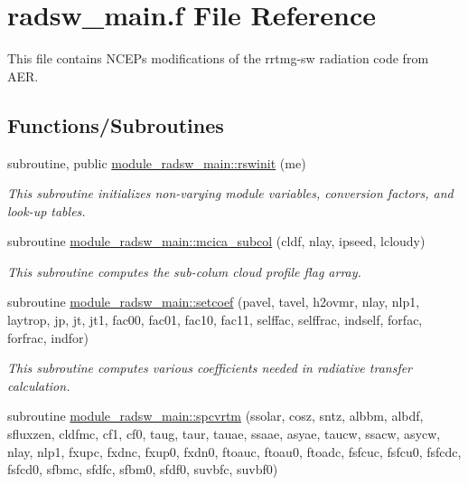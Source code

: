 \hypertarget{radsw__main_8f}{}\section{radsw\+\_\+main.\+f File Reference}
\label{radsw__main_8f}


This file contains N\+C\+EP\textquotesingle{}s modifications of the rrtmg-\/sw radiation code from A\+ER.  


\subsection*{Functions/\+Subroutines}
\begin{DoxyCompactItemize}
\item 
subroutine, public \hyperlink{group__module__radsw__main_ga5b0d35149515607d94f42b6ee5a40665}{module\+\_\+radsw\+\_\+main\+::rswinit} (me)
\begin{DoxyCompactList}\small\item\em This subroutine initializes non-\/varying module variables, conversion factors, and look-\/up tables. \end{DoxyCompactList}\item 
subroutine \hyperlink{group__module__radsw__main_gadf2f35094ed7dc31e8f52781745cf021}{module\+\_\+radsw\+\_\+main\+::mcica\+\_\+subcol} (cldf, nlay, ipseed, lcloudy)
\begin{DoxyCompactList}\small\item\em This subroutine computes the sub-\/colum cloud profile flag array. \end{DoxyCompactList}\item 
subroutine \hyperlink{group__module__radsw__main_ga5eb9918ebc222138a9dad016440e1a74}{module\+\_\+radsw\+\_\+main\+::setcoef} (pavel, tavel, h2ovmr, nlay, nlp1, laytrop, jp, jt, jt1, fac00, fac01, fac10, fac11, selffac, selffrac, indself, forfac, forfrac, indfor)
\begin{DoxyCompactList}\small\item\em This subroutine computes various coefficients needed in radiative transfer calculation. \end{DoxyCompactList}\item 
subroutine \hyperlink{group__module__radsw__main_ga859cc14063a58e9d0a252e4366b9fff3}{module\+\_\+radsw\+\_\+main\+::spcvrtm} (ssolar, cosz, sntz, albbm, albdf, sfluxzen, cldfmc, cf1, cf0, taug, taur, tauae, ssaae, asyae, taucw, ssacw, asycw, nlay, nlp1, fxupc, fxdnc, fxup0, fxdn0, ftoauc, ftoau0, ftoadc, fsfcuc, fsfcu0, fsfcdc, fsfcd0, sfbmc, sfdfc, sfbm0, sfdf0, suvbfc, suvbf0)

\end{DoxyCompactItemize}

